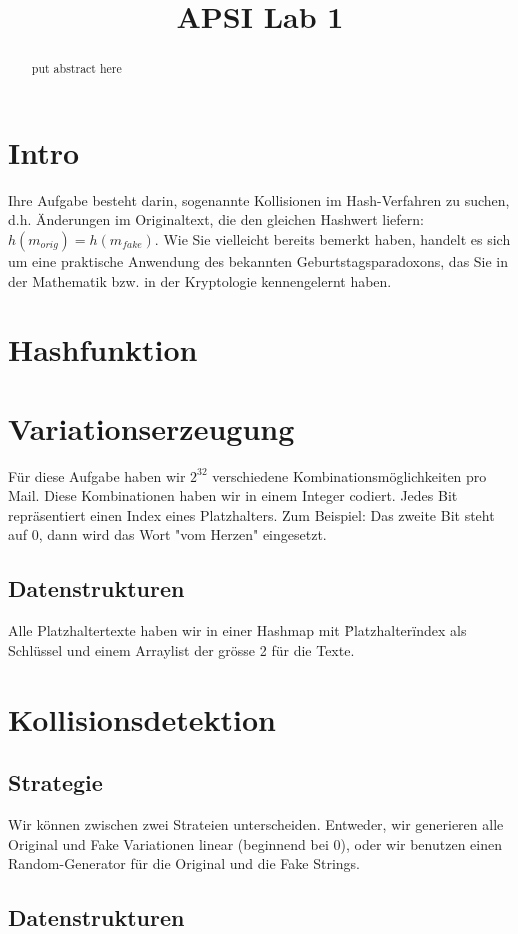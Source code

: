 \documentclass[12pt]{scrartcl}
\title{ %
APSI Lab 1
\vspace{0.2cm}
}
\begin{document}
 \maketitle
 \thispagestyle{firststyle}
 \pagestyle{firststyle}
 \begin{abstract}
 \begin{center}
  put abstract here  
 \end{center}
 \vspace{0.5cm}
\hrulefill
\end{abstract}

 \pagestyle{documentstyle}
 \tableofcontents
 \pagebreak
\section{Intro}
Ihre Aufgabe besteht darin, sogenannte Kollisionen im Hash-Verfahren zu suchen, d.h. Änderungen
im Originaltext, die den gleichen Hashwert liefern: $ h(m_{orig}) = h(m_{fake})$. Wie Sie vielleicht
bereits bemerkt haben, handelt es sich um eine praktische Anwendung des bekannten
Geburtstagsparadoxons, das Sie in der Mathematik bzw. in der Kryptologie kennengelernt
haben.

\section{Hashfunktion}

\section{Variationserzeugung}
Für diese Aufgabe haben wir $2^{32}$ verschiedene Kombinationsmöglichkeiten pro Mail. Diese Kombinationen haben wir in einem Integer codiert. Jedes Bit repräsentiert einen Index eines Platzhalters. Zum Beispiel: Das zweite Bit steht auf 0, dann wird das Wort "vom Herzen" eingesetzt.

\subsection{Datenstrukturen}
Alle Platzhaltertexte haben wir in einer Hashmap mit \"Platzhalter\" index als Schlüssel und einem Arraylist der grösse 2 für die Texte.

\section{Kollisionsdetektion}
\subsection{Strategie}
Wir können zwischen zwei Strateien unterscheiden. Entweder, wir generieren alle Original und Fake Variationen linear (beginnend bei 0), oder wir benutzen einen Random-Generator für die Original und die Fake Strings.

\subsection{Datenstrukturen}

 
\end{document}
